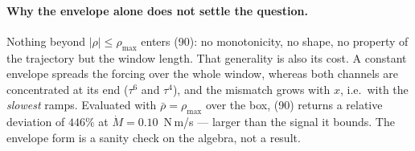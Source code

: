 \documentclass[10pt]{article}
\begin{document}
\paragraph{Why the envelope alone does not settle the question.}
Nothing beyond $|\rho|\le\rho_{\max}$ enters (90): no monotonicity, no
shape, no property of the trajectory but the window length. That
generality is also its cost. A constant envelope spreads the forcing
over the whole window, whereas both channels are concentrated at its
end ($\tau^6$ and $\tau^4$), and the mismatch grows with $x$, i.e.\
with the \emph{slowest} ramps. Evaluated with $\bar\rho = \rho_{\max}$
over the box, (90) returns a relative deviation of $446\%$ at $\dot M = 0.10$~N\,m/s --- larger than the signal it
bounds. The envelope form is a sanity check on the algebra, not a
result.
\end{document}
